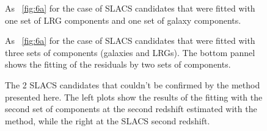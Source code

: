 \documentclass[12pt,preprint]{aastex}
\begin{document}
\clearpage
\begin{figure}
\caption{As \figurename~\ref{fig:6a} for the case of SLACS candidates
  that were fitted with one set of LRG components and one set of
  galaxy components.}
\label{fig:7}
\end{figure}

\clearpage
\begin{figure}
\caption{As \figurename~\ref{fig:6a} for the case of SLACS candidates
  that were fitted with three sets of components (galaxies and
  LRGs). The bottom pannel shows the fitting of the residuals by two
  sets of components.}
\label{fig:8}
\end{figure}

\clearpage
\begin{figure}
\begin{center}
\caption{The 2 SLACS candidates that couldn't be confirmed by the
  method presented here. The left plots show the results of the
  fitting with the second set of components at the second redshift
  estimated with the method, while the right at the SLACS second
  redshift.}
\label{fig:9}
\end{center}
\end{figure}
\end{document}
